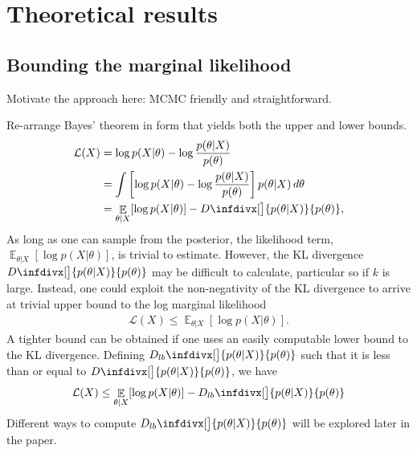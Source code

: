 \documentclass[10pt,a4paper]{article}
\DeclareMathOperator{\EX}{\mathbb{E}}%
\newcommand{\infdiv}{D\infdivx}
\newcommand{\infdivlb}{D_{lb}\infdivx}
\begin{document}
\section{Theoretical results}
\subsection{Bounding the marginal likelihood}

Motivate the approach here: MCMC friendly and straightforward.

Re-arrange Bayes' theorem in form that yields both the upper and lower bounds.
\begin{align}
\mathcal{L}(X) &= \log p(X | \theta) - \log \frac{p(\theta | X)}{p(\theta)} \label{eq:logmarglike}\\
&= \int \left [ \log p(X | \theta) -  \log \frac{p(\theta | X)}{p(\theta)} \right ] p(\theta|X) \, d\theta  \notag\\
&=\EX_{\theta | X} [ \log  p(X|\theta)]  -  \infdiv[\big]{p(\theta | X)}{p(\theta)},
\label{eq:marg_up}
\end{align}
As long as one can sample from the posterior, the likelihood term, $\EX_{\theta | X} [ \log  p(X|\theta)]$, is trivial to estimate. However, the KL divergence $ \infdiv[\big]{p(\theta | X)}{p(\theta)}$ may be difficult to calculate, particular so if $k$ is large. Instead, one could exploit the non-negativity of the KL divergence to arrive at trivial upper bound to the log marginal likelihood
\begin{align}
\mathcal{L}(X) \leq \EX_{\theta | X} [ \log  p(X|\theta)].
\end{align}
A tighter bound can be obtained if one uses an easily computable lower bound to the KL divergence. Defining $\infdivlb[\big]{p(\theta | X)}{p(\theta)}$ such that it is less than or equal to $\infdiv[\big]{p(\theta | X)}{p(\theta)}$, we have
\begin{align}
\mathcal{L}(X) \leq \EX_{\theta | X} [ \log  p(X|\theta)] -  \infdivlb[\big]{p(\theta | X)}{p(\theta)}
\end{align}
Different ways to compute $\infdivlb[\big]{p(\theta | X)}{p(\theta)}$ will be explored later in the paper.
\end{document}
